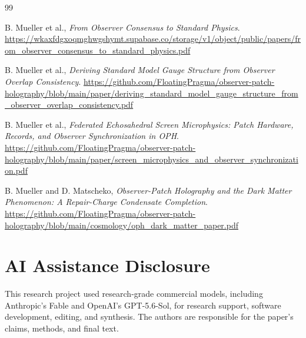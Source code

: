 \documentclass[11pt]{article}
\numberwithin{equation}{section}
\theoremstyle{remark}
\begin{document}
\begin{thebibliography}{99}

B. Mueller et al.,
\emph{From Observer Consensus to Standard Physics}.
\url{https://wkaxfdgxoqmghwgshymt.supabase.co/storage/v1/object/public/papers/from_observer_consensus_to_standard_physics.pdf}

B. Mueller et al.,
\emph{Deriving Standard Model Gauge Structure from Observer Overlap Consistency}.
\url{https://github.com/FloatingPragma/observer-patch-holography/blob/main/paper/deriving_standard_model_gauge_structure_from_observer_overlap_consistency.pdf}

B. Mueller et al.,
\emph{Federated Echosahedral Screen Microphysics: Patch Hardware, Records, and Observer Synchronization in OPH}.
\url{https://github.com/FloatingPragma/observer-patch-holography/blob/main/paper/screen_microphysics_and_observer_synchronization.pdf}

B. Mueller and D. Matscheko,
\emph{Observer-Patch Holography and the Dark Matter Phenomenon: A Repair-Charge Condensate Completion}.
\url{https://github.com/FloatingPragma/observer-patch-holography/blob/main/cosmology/oph_dark_matter_paper.pdf}

\end{thebibliography}

\section*{AI Assistance Disclosure}
This research project used research-grade commercial models, including
Anthropic's Fable and OpenAI's GPT-5.6-Sol, for research support, software
development, editing, and synthesis. The authors are responsible for the
paper's claims, methods, and final text.
\end{document}
